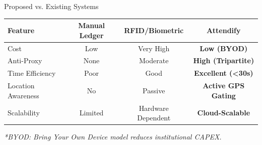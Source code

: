 \documentclass[10pt, aspectratio=169]{beamer}
\begin{document}
\begin{frame}{Proposed vs. Existing Systems}
    \begin{table}
        \centering
        \small
        \begin{tabular}{@{}lccc@{}}
            \toprule
            \textbf{Feature} & \textbf{Manual Ledger} & \textbf{RFID/Biometric} & \textbf{Attendify} \\ \midrule
            Cost & Low & Very High & \textbf{Low (BYOD)} \\
            Anti-Proxy & None & Moderate & \textbf{High (Tripartite)} \\
            Time Efficiency & Poor & Good & \textbf{Excellent (<30s)} \\
            Location Awareness & No & Passive & \textbf{Active GPS Gating} \\
            Scalability & Limited & Hardware Dependent & \textbf{Cloud-Scalable} \\ \bottomrule
        \end{tabular}
    \end{table}
    \vfill
    \textit{*BYOD: Bring Your Own Device model reduces institutional CAPEX.}
\end{frame}

\end{document}
